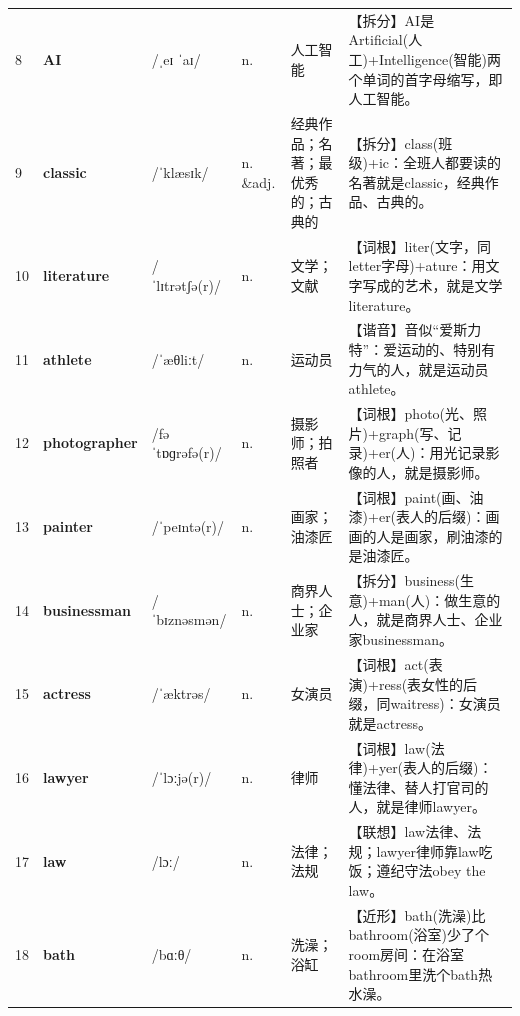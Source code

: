 \documentclass[UTF8,a4paper,11pt,oneside]{ctexbook}
\newcommand{\cellword}[1]{{\bfseries\textcolor{wordcol}{#1}}}
\newcommand{\cellipa}[1]{{\footnotesize\textcolor{ipacol}{#1}}}
\newcommand{\cellpos}[1]{\textcolor{poscol}{#1}}
\newcommand{\cellno}[1]{\textcolor{volcolor!75!black}{#1}}
\begin{document}
{\begin{longtable}{@{}C{0.045\textwidth}L{0.155\textwidth}L{0.175\textwidth}C{0.070\textwidth}L{0.180\textwidth}L{0.282\textwidth}@{}}
\cellno{8} & \cellword{AI} & \cellipa{/ˌeɪ ˈaɪ/} & \cellpos{n.} & 人工智能 & \textcolor{tagSplit}{【拆分】}AI是Artificial(人工)+Intelligence(智能)两个单词的首字母缩写，即人工智能。 \\
 \cellno{9} & \cellword{classic} & \cellipa{/ˈklæsɪk/} & \cellpos{n. \&adj.} & 经典作品；名著；最优秀的；古典的 & \textcolor{tagSplit}{【拆分】}class(班级)+ic：全班人都要读的名著就是classic，经典作品、古典的。 \\
\cellno{10} & \cellword{literature} & \cellipa{/ˈlɪtrətʃə(r)/} & \cellpos{n.} & 文学；文献 & \textcolor{tagRoot}{【词根】}liter(文字，同letter字母)+ature：用文字写成的艺术，就是文学literature。 \\
 \cellno{11} & \cellword{athlete} & \cellipa{/ˈæθliːt/} & \cellpos{n.} & 运动员 & \textcolor{tagSound}{【谐音】}音似“爱斯力特”：爱运动的、特别有力气的人，就是运动员athlete。 \\
\cellno{12} & \cellword{photographer} & \cellipa{/fəˈtɒɡrəfə(r)/} & \cellpos{n.} & 摄影师；拍照者 & \textcolor{tagRoot}{【词根】}photo(光、照片)+graph(写、记录)+er(人)：用光记录影像的人，就是摄影师。 \\
 \cellno{13} & \cellword{painter} & \cellipa{/ˈpeɪntə(r)/} & \cellpos{n.} & 画家；油漆匠 & \textcolor{tagRoot}{【词根】}paint(画、油漆)+er(表人的后缀)：画画的人是画家，刷油漆的是油漆匠。 \\
\cellno{14} & \cellword{businessman} & \cellipa{/ˈbɪznəsmən/} & \cellpos{n.} & 商界人士；企业家 & \textcolor{tagSplit}{【拆分】}business(生意)+man(人)：做生意的人，就是商界人士、企业家businessman。 \\
 \cellno{15} & \cellword{actress} & \cellipa{/ˈæktrəs/} & \cellpos{n.} & 女演员 & \textcolor{tagRoot}{【词根】}act(表演)+ress(表女性的后缀，同waitress)：女演员就是actress。 \\
\cellno{16} & \cellword{lawyer} & \cellipa{/ˈlɔːjə(r)/} & \cellpos{n.} & 律师 & \textcolor{tagRoot}{【词根】}law(法律)+yer(表人的后缀)：懂法律、替人打官司的人，就是律师lawyer。 \\
 \cellno{17} & \cellword{law} & \cellipa{/lɔː/} & \cellpos{n.} & 法律；法规 & \textcolor{tagAssoc}{【联想】}law法律、法规；lawyer律师靠law吃饭；遵纪守法obey the law。 \\
\cellno{18} & \cellword{bath} & \cellipa{/bɑːθ/} & \cellpos{n.} & 洗澡；浴缸 & \textcolor{tagNear}{【近形】}bath(洗澡)比bathroom(浴室)少了个room房间：在浴室bathroom里洗个bath热水澡。 \\

\end{longtable}}
\end{document}

